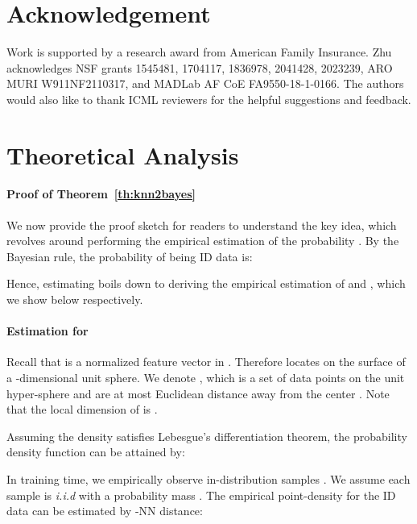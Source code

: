 \documentclass[nohyperref]{article}
\theoremstyle{plain}
\theoremstyle{definition}
\theoremstyle{remark}
\begin{document}
\section*{Acknowledgement}
Work is supported by a research award from American Family Insurance. Zhu acknowledges NSF grants 1545481, 1704117, 1836978, 2041428, 2023239, ARO MURI W911NF2110317, and MADLab AF CoE FA9550-18-1-0166. The authors would also like to thank ICML reviewers for the helpful suggestions and feedback.






\newpage
\appendix
\onecolumn








\section{Theoretical Analysis}
\label{sup:theory}




\paragraph{Proof of Theorem~\ref{th:knn2bayes}} We now provide the proof sketch for readers to understand the key idea, which revolves around performing the empirical estimation of the probability . By the Bayesian rule, the probability of  being ID data is:

Hence, estimating  boils down to deriving the empirical estimation of  and , which we show below respectively.



\paragraph{Estimation for }

Recall that  is a normalized feature vector in . Therefore  locates on the surface of a -dimensional unit sphere. 
We denote , which is a set of data points on the unit hyper-sphere and are at most  Euclidean distance away from the center . Note that the local dimension of  is . 

Assuming the density satisfies Lebesgue's differentiation theorem, the probability density function can be attained by: 

In training time, we empirically observe  in-distribution samples . We assume each sample  is \emph{i.i.d} with a probability mass . The empirical point-density for the ID data can be estimated by -NN distance:
\end{document}
